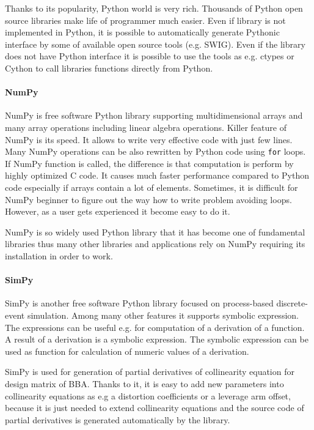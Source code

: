 \documentclass[a4paper,12pt]{article}
\begin{document}

Thanks to its popularity, Python world is very rich. 
Thousands of Python open source libraries make life of programmer much easier. Even 
if library is not implemented in Python, it is possible to automatically generate Pythonic 
interface by some of available open source tools (e.g. SWIG). 
Even if the library does not have Python interface it 
is possible to use the tools as e.g. ctypes or Cython to call libraries functions directly from Python.

\paragraph{NumPy}


NumPy is free software Python library supporting multidimensional arrays and many array operations
including linear algebra operations. Killer feature of NumPy is its speed.
 It allows to write very effective code with just few lines. Many  NumPy operations can be
also rewritten by Python code using  {\tt for} loops. If NumPy function is called, the difference is
 that computation is perform by highly optimized C code. It causes much faster performance compared 
to Python code especially if arrays contain 
a lot of elements. Sometimes, it is difficult for NumPy beginner to figure out the way how 
to write problem avoiding loops. However, as a user gets experienced 
it become easy to do it. 

NumPy is so widely used Python library that it has become one of fundamental libraries thus many
other libraries and applications rely on NumPy requiring its installation in order to work.

\paragraph{SimPy}

SimPy is another free software Python library focused on process-based discrete-event simulation.
Among many other features it supports symbolic expression. The expressions can be useful
e.g. for computation of a derivation of a function. A result of a derivation is a symbolic expression.
The symbolic expression can be used as function for calculation of numeric values of a derivation. 

SimPy is used for generation of partial derivatives of collinearity equation for design matrix 
of BBA. Thanks to it,
it is easy to add new parameters into collinearity equations as e.g a distortion coefficients or a leverage arm offset,
because it is just needed to extend collinearity equations and the source code of partial derivatives 
is generated automatically by the library. 
\end{document}
